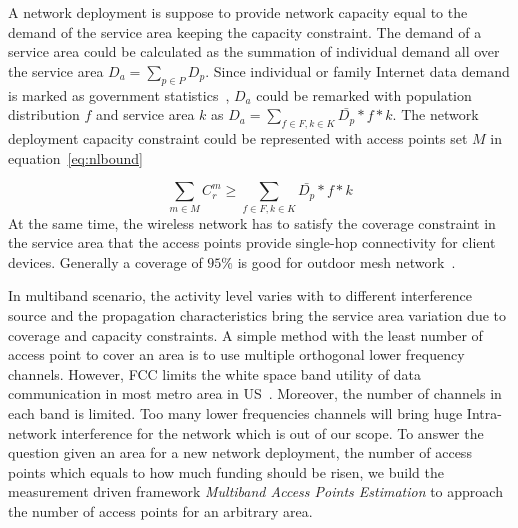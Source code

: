 A network deployment is suppose to provide network capacity equal to the demand of the service 
area keeping the capacity constraint. The demand of a service area could be calculated as the 
summation of individual demand all over the service area $D_a=\sum_{p\in P}D_p$. Since 
individual or family Internet data demand is marked as government statistics~\cite{rosston2011household}, 
$D_a$ could be remarked with population distribution $f$ and service area $k$ as 
$D_a=\sum_{f \in F,k \in K}\bar{D_p}*f*k$. 
The network deployment capacity constraint could be represented with access points set $M$ 
in equation~\ref{eq:nlbound}

\begin{equation}
\label{eq:nlbound}
\sum_{m \in M}C_r^m \ge \sum_{f \in F,k \in K}\bar{D_p}*f*k
\end{equation}
At the same time, the wireless network has to satisfy the coverage constraint in the service 
area that the access points provide single-hop connectivity for client devices. 
Generally a coverage of $95\%$ is good for outdoor mesh network~\cite{robinson2010deploying}.

In multiband scenario, the activity level varies with to different interference source 
and the propagation characteristics bring the service area variation due to coverage and 
capacity constraints. A simple method with the least number of access point to cover an area is to use 
multiple orthogonal lower frequency channels. However, FCC limits the white space band utility 
of data communication in most metro area in US~\cite{googledatabase}. Moreover, the number of channels in each 
band is limited. Too many lower frequencies channels will bring huge Intra-network interference for 
the network which is out of our scope. To answer the question given an area for a new network deployment, 
the number of access points which equals to how much funding should be risen, we build the measurement driven
framework {\it Multiband Access Points Estimation} to approach the number of access points for
an arbitrary area.


